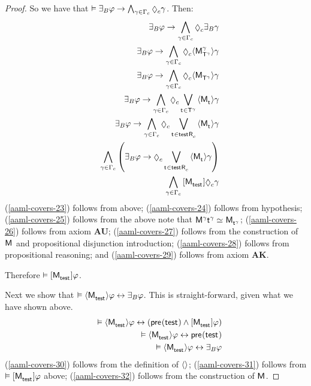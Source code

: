 \begin{proof}
So we have that $\entails \someactsBs \phi \implies \bigwedge_{\gamma \in \Gamma_\agentC} \possibleC \gamma$.
Then:
\begin{eqnarray}
    && \someactsBs \phi \implies \bigwedge_{\gamma \in \Gamma_\agentC} \possibleC \someactsBs \gamma \label{aaml-covers-23}\\
    && \someactsBs \phi \implies \bigwedge_{\gamma \in \Gamma_\agentC} \possibleC \actionE{\aPModel[\gamma]{\aStatesT[\gamma]}} \gamma \label{aaml-covers-24}\\
    && \someactsBs \phi \implies \bigwedge_{\gamma \in \Gamma_\agentC} \possibleC \actionE{\aPModel{\aStatesT[\gamma]}} \gamma \label{aaml-covers-25}\\
    && \someactsBs \phi \implies \bigwedge_{\gamma \in \Gamma_\agentC} \possibleC \bigvee_{\aStateT \in \aStatesT[\gamma]} \actionE{\aPModel{\aStateT}} \gamma \label{aaml-covers-26}\\
    && \someactsBs \phi \implies \bigwedge_{\gamma \in \Gamma_\agentC} \possibleC \bigvee_{\aStateT \in \aSuccessorsC{\aStateTest}} \actionE{\aPModel{\aStateT}} \gamma \label{aaml-covers-27}\\
    && \bigwedge_{\gamma \in \Gamma_\agentC} \left(\someactsBs \phi \implies \possibleC \bigvee_{\aStateT \in \aSuccessorsC{\aStateTest}} \actionE{\aPModel{\aStateT}} \gamma\right) \label{aaml-covers-28}\\
    && \bigwedge_{\gamma \in \Gamma_\agentC} \actionA{\aPModel{\aStateTest}} \possibleC \gamma \label{aaml-covers-29}
\end{eqnarray}
(\ref{aaml-covers-23}) follows from above;
(\ref{aaml-covers-24}) follows from hypothesis;
(\ref{aaml-covers-25}) follows from the above note that $\aModel[\gamma]{\aStateT[\gamma]} \bisimilar \aPModel{\aStateT[\gamma]}$;
(\ref{aaml-covers-26}) follows from \axiomAamlK{} axiom {\bf AU};
(\ref{aaml-covers-27}) follows from the construction of $\aModel$ and propositional disjunction introduction;
(\ref{aaml-covers-28}) follows from propositional reasoning; and
(\ref{aaml-covers-29}) follows from \axiomAamlK{} axiom {\bf AK}.

Therefore $\entails \actionA{\aPModel{\aStateTest}} \phi$.

Next we show that $\entails \actionE{\aPModel{\aStateTest}} \phi \iff \someactsBs \phi$. 
This is straight-forward, given what we have shown above.
\begin{eqnarray}
    && \entails \actionE{\aPModel{\aStateTest}} \phi \iff (\aPrecondition(\aStateTest) \land \actionA{\aPModel{\aStateTest}} \phi) \label{aaml-covers-30}\\
    && \entails \actionE{\aPModel{\aStateTest}} \phi \iff \aPrecondition(\aStateTest) \label{aaml-covers-31}\\
    && \entails \actionE{\aPModel{\aStateTest}} \phi \iff \someactsBs \phi \label{aaml-covers-32}
\end{eqnarray}
(\ref{aaml-covers-30}) follows from the definition of ${\langle {} \rangle}$;
(\ref{aaml-covers-31}) follows from $\entails \actionA{\aPModel{\aStateTest}} \phi$ above;
(\ref{aaml-covers-32}) follows from the construction of $\aModel$.


\end{proof}
